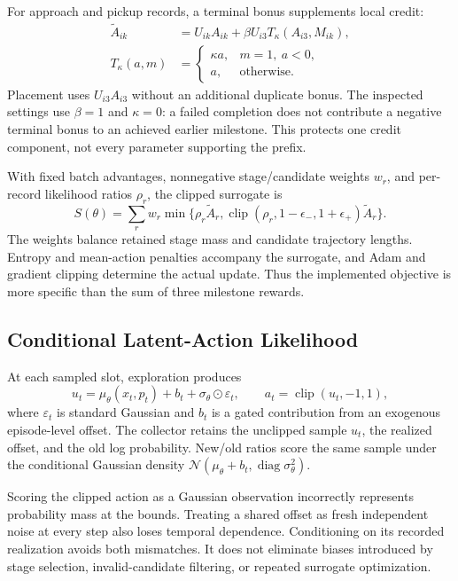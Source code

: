 For approach and pickup records, a terminal bonus supplements local credit:
\begin{align}
\widetilde A_{ik}&=U_{ik}A_{ik}+\beta U_{i3}T_\kappa(A_{i3},M_{ik}),\label{eq:credit}\\
T_\kappa(a,m)&=\begin{cases}\kappa a,&m=1,\ a<0,\\a,&\text{otherwise}.\end{cases}
\end{align}
Placement uses $U_{i3}A_{i3}$ without an additional duplicate bonus. The inspected settings use $\beta=1$ and $\kappa=0$: a failed completion does not contribute a negative terminal bonus to an achieved earlier milestone. This protects one credit component, not every parameter supporting the prefix.

With fixed batch advantages, nonnegative stage/candidate weights $w_r$, and per-record likelihood ratios $\rho_r$, the clipped surrogate is
\begin{equation}
S(\theta)=\sum_r w_r\min\{\rho_r\widetilde A_r,
\operatorname{clip}(\rho_r,1-\epsilon_-,1+\epsilon_+)\widetilde A_r\}.
\end{equation}
The weights balance retained stage mass and candidate trajectory lengths. Entropy and mean-action penalties accompany the surrogate, and Adam and gradient clipping determine the actual update. Thus the implemented objective is more specific than the sum of three milestone rewards.

\subsection{Conditional Latent-Action Likelihood}
At each sampled slot, exploration produces
\begin{equation}
u_t=\mu_\theta(x_t,p_t)+b_t+\sigma_\theta\odot\varepsilon_t,
\qquad a_t=\operatorname{clip}(u_t,-1,1),
\end{equation}
where $\varepsilon_t$ is standard Gaussian and $b_t$ is a gated contribution from an exogenous episode-level offset. The collector retains the unclipped sample $u_t$, the realized offset, and the old log probability. New/old ratios score the same sample under the conditional Gaussian density $\mathcal N(\mu_\theta+b_t,\operatorname{diag}\sigma_\theta^2)$.

Scoring the clipped action as a Gaussian observation incorrectly represents probability mass at the bounds. Treating a shared offset as fresh independent noise at every step also loses temporal dependence. Conditioning on its recorded realization avoids both mismatches. It does not eliminate biases introduced by stage selection, invalid-candidate filtering, or repeated surrogate optimization.

